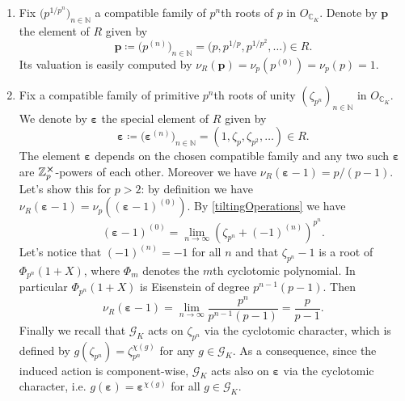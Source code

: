 \begin{ex}[]\leavevmode\vspace{-.2\baselineskip}\label{ExampleEltsTilt}
\begin{enumerate}
\item Fix $\big( p^{1/p^n} \big)_{n \in \mathbb{N}}$ 
	a compatible family of $p^n$th roots of $p$
	in $O_{\mathbb{C}_K}$.
	Denote by $\mathbf{p}$ the element of $R$ given by
	\begin{equation*}
		\mathbf{p} \coloneqq \big( p^{(n)} \big)_{n \in \mathbb{N}} =
		\big( p, p^{1/p}, p^{1/p^2}, \ldots \big) \in R
	.\end{equation*}
	Its valuation is easily computed by
	$\nu_R(\mathbf{p}) = \nu_p(p^{(0)}) = \nu_p(p) = 1$.

\item Fix a compatible family of primitive $p^n$th roots of unity
	$\left( \zeta_{p^n} \right)_{n \in \mathbb{N}}$ in $O_{\mathbb{C}_K}$.
	We denote by $\boldsymbol\varepsilon$ the special element of $R$ given by
	\begin{equation*}
		\boldsymbol\varepsilon \coloneqq \big( \boldsymbol\varepsilon^{(n)} \big)_{n \in \mathbb{N}} =
		\left( 1, \zeta_p, \zeta_{p^2}, \ldots \right) \in R
	.\end{equation*}
	The element $\boldsymbol\varepsilon$ depends on the chosen
	compatible family
	and any two such $\boldsymbol\varepsilon$
	are $\mathbb{Z}_{p}^{\cross}$-powers of each other.
	Moreover we have
	$\nu_R \left( \boldsymbol\varepsilon - 1 \right) = p/ (p - 1)$.
	Let's show this for $p > 2$: by definition we have
	$\nu_R(\boldsymbol\varepsilon - 1) = \nu_p \left( (\boldsymbol\varepsilon -1 )^{(0)} \right)$.
	By \cref{tiltingOperations} we have
	\begin{equation*}
		\left( \boldsymbol\varepsilon -1 \right)^{(0)} =
		\lim_{n \to \infty} \left( \zeta_{p^n} + (-1)^{(n)} \right)^{p^n}
	.\end{equation*}
	Let's notice that $\left( -1 \right)^{(n)} = -1$ for all $n$
	and that $\zeta_{p^n} - 1$ is a root of $\Phi_{p^n}(1+X)$,
	where $\Phi_m$ denotes the $m$th cyclotomic polynomial.
	In particular $\Phi_{p^n}(1+X)$ is Eisenstein of degree
	$p^{n-1}(p-1)$.
	Then
	\begin{equation*}
		\nu_R(\boldsymbol\varepsilon - 1) =
		\lim_{n \to \infty} \frac{ p^n }{ p^{n-1}(p-1) } =
		\frac{ p }{ p-1 }
	.\end{equation*}
	Finally we recall that $\mathscr{G}_K$ acts on $\zeta_{p^n}$ via
	the cyclotomic character, which is defined by
	$g(\zeta_{p^n}) = \zeta_{p^n}^{\chi(g)}$ for any $g \in \mathscr{G}_K$.
	As a consequence, since the induced action is component-wise,
	$\mathscr{G}_K$ acts also on $\boldsymbol\varepsilon$ via the cyclotomic character,
	i.e. $g(\boldsymbol\varepsilon) = \boldsymbol\varepsilon^{\chi(g)}$
	for all $g \in \mathscr{G}_K$.
\end{enumerate}
\end{ex}



